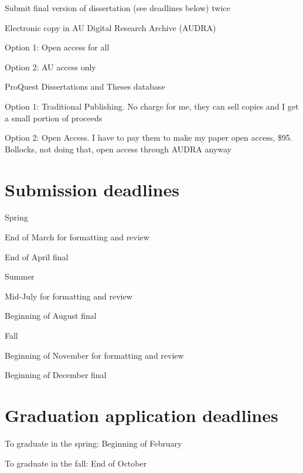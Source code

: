 \begin{coi}
		\item Submit final version of dissertation (see deadlines below) twice
			\begin{coi}
				\item Electronic copy in AU Digital Research Archive (AUDRA)
					\begin{coi}
						\item Option 1: Open access for all
						\item Option 2: AU access only
					\end{coi}
				\item ProQuest Dissertations and Theses database
					\begin{coi}
						\item Option 1: Traditional Publishing. No charge for me, they can sell copies and I get a small portion of proceeds
						\item Option 2: Open Access. I have to pay them to make my paper open access, \$95. Bollocks, not doing that, open access through AUDRA anyway
					\end{coi}
			\end{coi}
	\end{coi}




\section*{Submission deadlines}
	\begin{coi}
		\item Spring
			\begin{coi}
				\item End of March for formatting and review
				\item End of April final
			\end{coi}
		\item Summer
			\begin{coi}
				\item Mid-July for formatting and review
				\item Beginning of August final
			\end{coi}
		\item Fall
			\begin{coi}
				\item Beginning of November for formatting and review
				\item Beginning of December final
			\end{coi}
	\end{coi}


\section*{Graduation application deadlines}
	\begin{coi}
		\item To graduate in the spring: Beginning of February
		\item To graduate in the fall: End of October
	\end{coi}
















